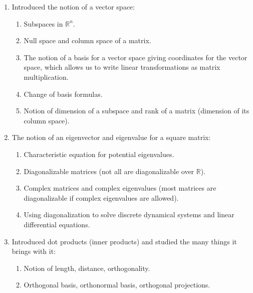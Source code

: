 \begin{enumerate}
 Then, we discovered the determinant of a matrix which gives us a way to determine when a matrix is invertible.
        \begin{enumerate}
            \item Lots of neat properties of determinants ($\det(AB) = \det(A) \det(B)$).
            \item An inductive formula for the determinant using expansion across any row or column.
        \end{enumerate}
        \item Introduced the notion of a vector space:
        \begin{enumerate}
            \item Subspaces in $\mathbb{R}^n$.
            \item Null space and column space of a matrix.
            \item The notion of a basis for a vector space giving coordinates for the vector space, which allows us to write linear transformations as matrix multiplication.
            \item Change of basis formulas.
            \item Notion of dimension of a subspace and rank of a matrix (dimension of its column space).
        \end{enumerate}
        \item The notion of an eigenvector and eigenvalue for a square matrix:
        \begin{enumerate}
            \item Characteristic equation for potential eigenvalues.
            \item Diagonalizable matrices (not all are diagonalizable over $\mathbb{R}$).
            \item Complex matrices and complex eigenvalues (most matrices are diagonalizable if complex eigenvalues are allowed).
            \item Using diagonalization to solve discrete dynamical systems and linear differential equations.
        \end{enumerate}
        \item Introduced dot products (inner products) and studied the many things it brings with it:
        \begin{enumerate}
            \item Notion of length, distance, orthogonality.
            \item Orthogonal basis, orthonormal basis, orthogonal projections.

\end{enumerate}
\end{enumerate}
